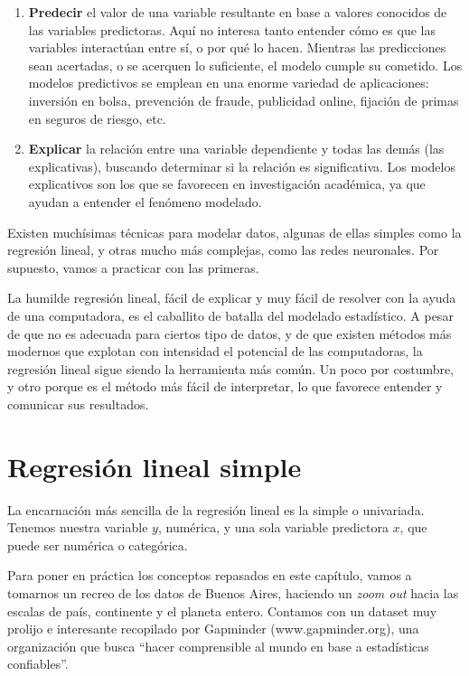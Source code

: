 \documentclass[spanish,]{book}
\begin{document}
\begin{enumerate}
\def\labelenumi{\arabic{enumi}.}
\item
  \textbf{Predecir} el valor de una variable resultante en base a valores conocidos de las variables predictoras. Aquí no interesa tanto entender cómo es que las variables interactúan entre sí, o por qué lo hacen. Mientras las predicciones sean acertadas, o se acerquen lo suficiente, el modelo cumple su cometido. Los modelos predictivos se emplean en una enorme variedad de aplicaciones: inversión en bolsa, prevención de fraude, publicidad online, fijación de primas en seguros de riesgo, etc.
\item
  \textbf{Explicar} la relación entre una variable dependiente y todas las demás (las explicativas), buscando determinar si la relación es significativa. Los modelos explicativos son los que se favorecen en investigación académica, ya que ayudan a entender el fenómeno modelado.
\end{enumerate}

Existen muchísimas técnicas para modelar datos, algunas de ellas simples como la regresión lineal, y otras mucho más complejas, como las redes neuronales. Por supuesto, vamos a practicar con las primeras.

La humilde regresión lineal, fácil de explicar y muy fácil de resolver con la ayuda de una computadora, es el caballito de batalla del modelado estadístico. A pesar de que no es adecuada para ciertos tipo de datos, y de que existen métodos más modernos que explotan con intensidad el potencial de las computadoras, la regresión lineal sigue siendo la herramienta más común. Un poco por costumbre, y otro porque es el método más fácil de interpretar, lo que favorece entender y comunicar sus resultados.

\hypertarget{regresion-lineal-simple}{%
\section{Regresión lineal simple}\label{regresion-lineal-simple}}

La encarnación más sencilla de la regresión lineal es la simple o univariada. Tenemos nuestra variable \(y\), numérica, y una sola variable predictora \(x\), que puede ser numérica o categórica.

Para poner en práctica los conceptos repasados en este capítulo, vamos a tomarnos un recreo de los datos de Buenos Aires, haciendo un \emph{zoom out} hacia las escalas de país, continente y el planeta entero. Contamos con un dataset muy prolijo e interesante recopilado por Gapminder (www.gapminder.org), una organización que busca ``hacer comprensible al mundo en base a estadísticas confiables''.
\end{document}
